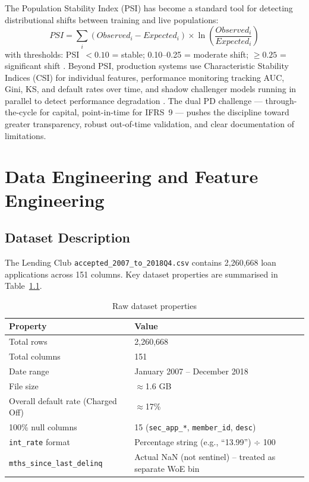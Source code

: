 \documentclass[12pt,a4paper]{report}
\begin{document}
The Population Stability Index (PSI) has become a standard tool for detecting distributional shifts between training and live populations:
\begin{equation}
  PSI = \sum_i \left(Observed_i - Expected_i\right) \times \ln\!\left(\frac{Observed_i}{Expected_i}\right)
\end{equation}
with thresholds: PSI~$< 0.10$ = stable; 0.10--0.25 = moderate shift; $\geq 0.25$ = significant shift \cite{garp2021, arthur_ai2025}. Beyond PSI, production systems use Characteristic Stability Indices (CSI) for individual features, performance monitoring tracking AUC, Gini, KS, and default rates over time, and shadow challenger models running in parallel to detect performance degradation \cite{mathworks}. The dual PD challenge --- through-the-cycle for capital, point-in-time for IFRS~9 --- pushes the discipline toward greater transparency, robust out-of-time validation, and clear documentation of limitations.

\chapter{Data Engineering and Feature Engineering}
\label{ch:data}

\section{Dataset Description}

The Lending Club \texttt{accepted\_2007\_to\_2018Q4.csv} \cite{kaggle2018, zenodo2024} contains 2,260,668 loan applications across 151 columns. Key dataset properties are summarised in Table~\ref{tab:dataset}.

\begin{table}[H]
\centering
\caption{Raw dataset properties}
\label{tab:dataset}
\begin{tabular}{ll}
\toprule
\textbf{Property} & \textbf{Value} \\
\midrule
Total rows          & 2,260,668 \\
Total columns       & 151 \\
Date range          & January 2007 -- December 2018 \\
File size           & $\approx$1.6 GB \\
Overall default rate (Charged Off) & $\approx$17\% \\
100\% null columns  & 15 (\texttt{sec\_app\_*}, \texttt{member\_id}, \texttt{desc}) \\
\texttt{int\_rate} format & Percentage string (e.g., ``13.99'') $\div$ 100 \\
\texttt{mths\_since\_last\_delinq} & Actual NaN (not sentinel) -- treated as separate WoE bin \\
\bottomrule
\end{tabular}
\end{table}
\end{document}
